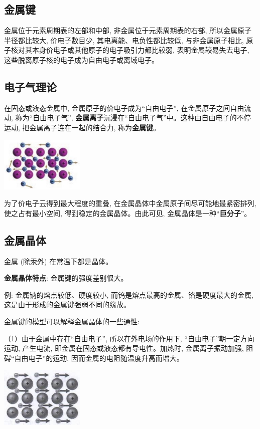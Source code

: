 \documentclass[10pt,cn]{elegantbook}
\begin{document}
\subsection{金属键}

 金属位于元素周期表的左部和中部, 非金属位于元素周期表的右部, 所以金属原子半径都比较大, 价电子数目少, 其电离能、电负性都比较低, 与非金属原子相比, 原子核对其本身价电子或其他原子的电子吸引力都比较弱, 表明金属较易失去电子, 这些脱离原子核的电子成为自由电子或离域电子。

\subsection{电子气理论}

 在固态或液态金属中, 金属原子的价电子成为“自由电子”, 在金属原子之间自由流动, 称为“自由电子气”, \textbf{金属离子}沉浸在“自由电子气”中。这种由自由电子的不停运动, 把金属离子连在一起的结合力, 称为\textbf{金属键}。

\begin{center}
	\includegraphics[max width=0.3\textwidth]{image/c115.jpg}
\end{center}

为了价电子云得到最大程度的重叠, 在金属晶体中金属原子间尽可能地最紧密排列, 使之占有最小空间, 得到稳定的金属晶体。由此可见, 金属晶体是一种“\textbf{巨分子}”。

\subsection{金属晶体}

 金属 (除汞外) 在常温下都是晶体。

\textbf{金属晶体特点}: 金属键的强度差别很大。

例: 金属钠的熔点较低、硬度较小, 而钨是熔点最高的金属、铬是硬度最大的金属, 这是由于形成的金属键强弱不同的缘故。


金属键的模型可以解释金属晶体的一些通性:

（1）由于金属中存在“自由电子”, 所以在外电场的作用下, “自由电子”朝一定方向运动, 产生电流, 即金属在固态或液态都有导电性。加热时, 金属离子振动加强, 阻碍“自由电子”的运动, 因而金属的电阻随温度升高而增大。

\begin{center}
	\includegraphics[max width=0.3\textwidth]{image/c116-1.jpg}
\end{center}
\end{document}
